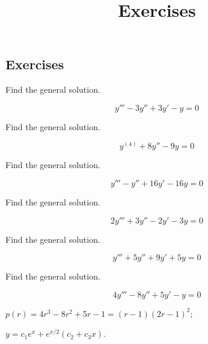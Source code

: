 \documentclass{ximera}
\title{Exercises} \license{CC BY-NC-SA 4.0}
\begin{document}
\begin{abstract}
\end{abstract}
\maketitle

\begin{onlineOnly}
\section*{Exercises}
\end{onlineOnly}


\begin{problem}\label{exer:9.2.1}  Find the general solution.

$$y'''-3y''+3y'-y=0$$
\end{problem}

\begin{problem}\label{exer:9.2.2} Find the general solution.

$$y^{(4)}+8y''-9y=0$$

\end{problem}

\begin{problem}\label{exer:9.2.3} Find the general solution.

$$y'''-y''+16y'-16y=0$$

\end{problem}


\begin{problem}\label{exer:9.2.4} Find the general solution.

$$2y'''+3y''-2y'-3y=0$$
\end{problem}

\begin{problem}\label{exer:9.2.5} Find the general solution.

$$y'''+5y''+9y'+5y=0$$

\end{problem}


\begin{problem}\label{exer:9.2.6}  Find the general solution.

$$4y'''-8y''+5y'-y=0$$

\begin{solution}
$p(r)=4r^3-8r^2+5r-1=(r-1)(2r-1)^2$;

$y=c_1e^x+e^{x/2}(c_2+c_3x)$.
\end{solution}

\end{problem}
\end{document}
